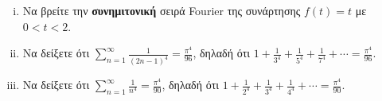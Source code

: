 \documentclass[a4paper,table]{report}
\begin{document}
\begin{mybox3}
  \begin{example}
  \item{}
  \item{}
    \begin{enumerate}[i)]
      \item Να βρείτε την \textbf{συνημιτονική} σειρά \textlatin{Fourier} της συνάρτησης 
        $ f(t)=t $ με $ 0 < t < 2 $.
      \item Να δείξετε ότι $ \sum_{n=1}^{\infty} \frac{1}{(2n-1)^{4}} = 
        \frac{\pi^{4}}{96} $, δηλαδή ότι $ 1 + \frac{1}{3^{4}} + \frac{1}{5^{4}} +
        \frac{1}{7^{4}} + \cdots = \frac{\pi ^{4}}{96} $.
      \item Να δείξετε ότι $ \sum_{n=1}^{\infty} \frac{1}{n^{4}} = 
        \frac{\pi^{4}}{90} $, δηλαδή ότι $ 1 + \frac{1}{2^{4}} + \frac{1}{3^{4}} +
        \frac{1}{4^{4}} + \cdots = \frac{\pi ^{4}}{90} $.
    \end{enumerate}
  \end{example}
\end{mybox3}
\end{document}
